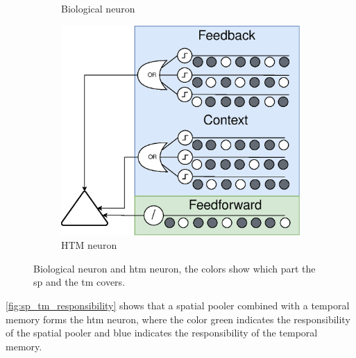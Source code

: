 \begin{figure}[H]
\begin{subfigure}[b]{0.35\linewidth}
        \caption{Biological neuron}
    \end{subfigure}
    \hfill
    \begin{subfigure}[b]{0.55\linewidth}
        \centering
        \includegraphics[width=\linewidth]{resources/related_works/neuron_htm}
        \caption{HTM neuron}
    \end{subfigure}
    \caption[SP and TM Responsibilities]{Biological neuron and \gls*{htm} neuron, the colors show which part the \gls*{sp} and the \gls*{tm} covers.}
    \label{fig:sp_tm_responsibility}
\end{figure}
\autoref{fig:sp_tm_responsibility} shows that a spatial pooler combined with a temporal memory forms the \gls*{htm} neuron, where the color green indicates the responsibility of the spatial pooler and blue indicates the responsibility of the temporal memory.
